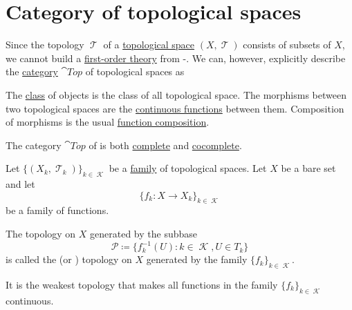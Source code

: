 \section{Category of topological spaces}\label{sec:category_of_topological_spaces}

\begin{definition}\label{def:category_of_small_topological_spaces}
  Since the topology \( \mscrT \) of a \hyperref[def:topological_space]{topological space} \( (X, \mscrT) \) consists of subsets of \( X \), we cannot build a \hyperref[def:first_order_theory]{first-order theory} from -. We can, however, explicitly describe the \hyperref[def:category]{category} \( \cat{Top} \) of topological spaces as
  \begin{refenum}
     The \hyperref[def:set]{class} of objects is the class of all topological space.
     The morphisms between two topological spaces are the \hyperref[def:global_continuity]{continuous functions} between them.
     Composition of morphisms is the usual \hyperref[def:set_valued_map/composition]{function composition}.
  \end{refenum}
\end{definition}

\begin{theorem}\label{thm:top_complete_cocomplete}
  The category \( \cat{Top} \) of is both \hyperref[def:category_of_cones/limit]{complete} and \hyperref[def:category_of_cones/colimit]{cocomplete}.
\end{theorem}

\begin{definition}\label{def:initial_topology}
  Let \( \{ (X_k, \mscrT_k) \}_{k \in \mscrK} \) be a \hyperref[def:indexed_family]{family} of topological spaces. Let \( X \) be a bare set and let
  \begin{equation*}
    \{ f_k: X \to X_k \}_{k \in \mscrK}
  \end{equation*}
  be a family of functions.

  The topology on \( X \) generated by the subbase
  \begin{equation*}
    \mathcal{P} \coloneqq \{ f_k^{-1}(U) \colon k \in \mscrK, U \in T_k \}
  \end{equation*}
  is called the  (or ) topology on \( X \) generated by the family \( \{ f_k \}_{k \in \mscrK} \).

  It is the weakest topology that makes all functions in the family \( \{ f_k \}_{k \in \mscrK} \) continuous.
\end{definition}

